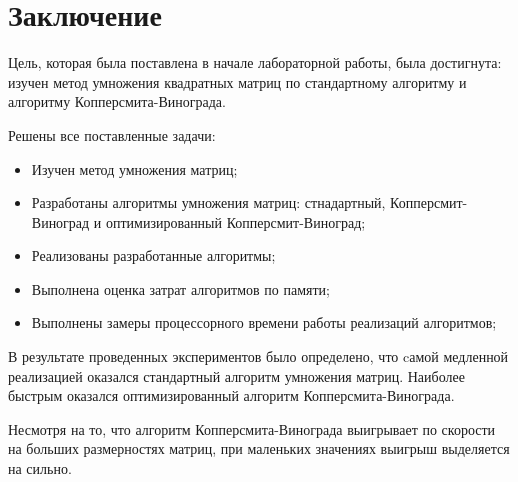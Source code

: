 \chapter*{Заключение}

Цель, которая была поставлена в начале лабораторной работы, была достигнута:
изучен метод умножения квадратных матриц
по стандартному алгоритму и алгоритму Копперсмита-Винограда.

Решены все поставленные задачи:

\begin{itemize}
	\item Изучен метод умножения матриц;
	\item Разработаны алгоритмы умножения матриц: стнадартный, Копперсмит-Виноград и оптимизированный Копперсмит-Виноград;
	\item Реализованы разработанные алгоритмы;
	\item Выполнена оценка затрат алгоритмов по памяти;
	\item Выполнены замеры процессорного времени работы реализаций алгоритмов;
\end{itemize}

В результате проведенных экспериментов было определено,
что cамой медленной реализацией оказался стандартный алгоритм умножения матриц.
Наиболее быстрым оказался оптимизированный алгоритм Копперсмита-Винограда.

Несмотря на то, что алгоритм Копперсмита-Винограда выигрывает по скорости на больших
размерностях матриц, при маленьких значениях выигрыш выделяется на сильно.